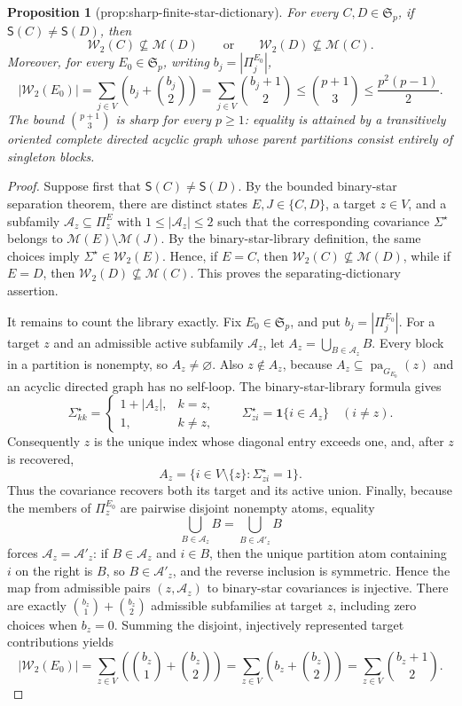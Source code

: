 \documentclass{article}
\newtheorem{proposition}{Proposition}
\begin{document}
\begin{proposition}[prop:sharp-finite-star-dictionary]\label{prop:sharp-finite-star-dictionary}
For every \(C,D\in\mathfrak S_p\), if \(\mathsf S(C)\neq\mathsf S(D)\), then
\[
\mathcal W_2(C)\not\subseteq\mathcal M(D)
\qquad\text{or}\qquad
\mathcal W_2(D)\not\subseteq\mathcal M(C).
\]
Moreover, for every \(E_0\in\mathfrak S_p\), writing \(b_j=|\Pi^{E_0}_j|\),
\[
|\mathcal W_2(E_0)|
=\sum_{j\in V}\left(b_j+\binom{b_j}{2}\right)
=\sum_{j\in V}\binom{b_j+1}{2}
\leq\binom{p+1}{3}
\leq\frac{p^2(p-1)}{2}.
\]
The bound \(\binom{p+1}{3}\) is sharp for every \(p\geq1\): equality is attained by a transitively oriented complete directed acyclic graph whose parent partitions consist entirely of singleton blocks.
\end{proposition}
\begin{proof}
Suppose first that \(\mathsf S(C)\neq\mathsf S(D)\).  By the bounded binary-star separation theorem, there are distinct states \(E,J\in\{C,D\}\), a target \(z\in V\), and a subfamily \(\mathcal A_z\subseteq\Pi^E_z\) with \(1\leq|\mathcal A_z|\leq2\) such that the corresponding covariance \(\Sigma^{\star}\) belongs to \(\mathcal M(E)\setminus\mathcal M(J)\).  By the binary-star-library definition, the same choices imply \(\Sigma^{\star}\in\mathcal W_2(E)\).  Hence, if \(E=C\), then \(\mathcal W_2(C)\not\subseteq\mathcal M(D)\), while if \(E=D\), then \(\mathcal W_2(D)\not\subseteq\mathcal M(C)\).  This proves the separating-dictionary assertion.

It remains to count the library exactly.  Fix \(E_0\in\mathfrak S_p\), and put \(b_j=|\Pi^{E_0}_j|\).  For a target \(z\) and an admissible active subfamily \(\mathcal A_z\), let \(A_z=\bigcup_{B\in\mathcal A_z}B\).  Every block in a partition is nonempty, so \(A_z\neq\varnothing\).  Also \(z\notin A_z\), because \(A_z\subseteq\operatorname{pa}_{G_{E_0}}(z)\) and an acyclic directed graph has no self-loop.  The binary-star-library formula gives
\[
\Sigma^{\star}_{kk}
=
\begin{cases}
1+|A_z|,&k=z,\\
1,&k\neq z,
\end{cases}
\qquad
\Sigma^{\star}_{zi}=\mathbf 1\{i\in A_z\}\quad(i\neq z).
\]
Consequently \(z\) is the unique index whose diagonal entry exceeds one, and, after \(z\) is recovered,
\[
A_z=\{i\in V\setminus\{z\}:\Sigma^{\star}_{zi}=1\}.
\]
Thus the covariance recovers both its target and its active union.  Finally, because the members of \(\Pi^{E_0}_z\) are pairwise disjoint nonempty atoms, equality
\[
\bigcup_{B\in\mathcal A_z}B
=
\bigcup_{B\in\mathcal A'_z}B
\]
forces \(\mathcal A_z=\mathcal A'_z\): if \(B\in\mathcal A_z\) and \(i\in B\), then the unique partition atom containing \(i\) on the right is \(B\), so \(B\in\mathcal A'_z\), and the reverse inclusion is symmetric.  Hence the map from admissible pairs \((z,\mathcal A_z)\) to binary-star covariances is injective.  There are exactly \(\binom{b_z}{1}+\binom{b_z}{2}\) admissible subfamilies at target \(z\), including zero choices when \(b_z=0\).  Summing the disjoint, injectively represented target contributions yields
\[
|\mathcal W_2(E_0)|
=\sum_{z\in V}\left(\binom{b_z}{1}+\binom{b_z}{2}\right)
=\sum_{z\in V}\left(b_z+\binom{b_z}{2}\right)
=\sum_{z\in V}\binom{b_z+1}{2}.
\]


\end{proof}
\end{document}
